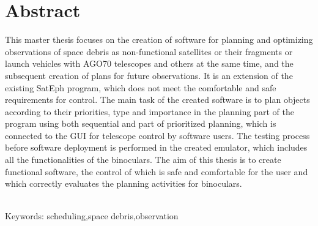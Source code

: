 \documentclass[12pt, a4paper, oneside]{book}
\begin{document}
\chapter*{Abstract}\label{chap:abstract_en}
This master thesis focuses on the creation of software for planning and optimizing observations of space debris as non-functional satellites or their fragments or launch vehicles with AGO70 telescopes and others at the same time, and the subsequent creation of plans for future observations. It is an extension of the existing SatEph program, which does not meet the comfortable and safe requirements for control. The main task of the created software is to plan objects according to their priorities, type and importance in the planning part of the program using both sequential and part of prioritized planning, which is connected to the GUI for telescope control by software users. The testing process before software deployment is performed in the created emulator, which includes all the functionalities of the binoculars. The aim of this thesis is to create functional software, the control of which is safe and comfortable for the user and which correctly evaluates the planning activities for binoculars.

~\\
Keywords: scheduling,space debris,observation
\vfill\eject 

\tableofcontents

\mainmatter



\backmatter

\nocite{*}



\listoffigures
\end{document}
